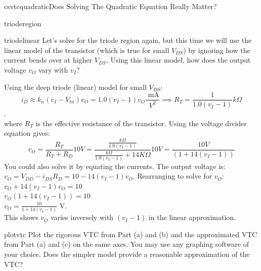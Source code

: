 \begin{mainquestion}{csvtcquadratic}{Does Solving The Quadratic Equation Really Matter?}
\begin{partquestion}{trioderegion}
\end{partquestion}

\begin{partquestion}{triodelinear}
{Let's solve for the triode region again, but this time we will use the linear model of the transistor (which is true for small $V_{DS}$) by ignoring how the current bends over at higher $V_{DS}$.  Using this linear model, how does the output voltage $v_O$ vary with $v_I$?}

\begin{answer}[2in]
        Using the deep triode (linear) model for small $V_{DS}$: 
        \[i_D \approx k_n (v_I - V_{tn})v_O = 1.0(v_I - 1)v_O \frac{\text{ mA}}{V^2} \implies R_T=\frac{1}{1.0(v_I - 1)}k\Omega\]. \\
        where $R_T$ is the effective resistance of the transistor. Using the voltage divider equation gives:
        \[v_O=\frac{R_T}{R_T+R_D}10V= \frac{\frac{k\Omega}{1.0(v_I - 1)}}{\frac{k\Omega}{1.0(v_I - 1)}+14K\Omega}10V=\frac{10V}{(1+14(v_I - 1))}\]
        You could also solve it by equating the currents. The output voltage is:\\
        $v_O = V_{DD} - i_{DS} R_D = 10 - 14(v_I - 1)v_O.$ 
        Rearranging to solve for $v_O$: \\
        $v_O + 14(v_I - 1)v_O = 10$ \\
        $v_O (1 + 14(v_I - 1)) = 10$ \\
        $v_O = \frac{10}{1 + 14(v_I - 1)} \text{ V}$. \\
        This shows $v_O$ varies inversely with $(v_I - 1)$ in the linear approximation.
\end{answer}

\qnewpage
\end{partquestion}

\begin{partquestion}{plotvtc}
{Plot the rigorous VTC from Part (a) and (b) and the approximated VTC from Part (a) and (c) on the same axes. You may use any graphing software of your choice. Does the simpler model provide a reasonable approximation of the VTC?}


\end{partquestion}
\end{mainquestion}

